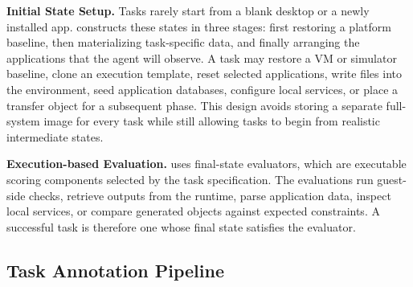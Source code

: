 
\noindent
\textbf{Initial State Setup.}
Tasks rarely start from a blank desktop or a newly installed app. \dataset constructs these states in three stages: first restoring a platform baseline, then materializing task-specific data, and finally arranging the applications that the agent will observe. A task may restore a VM or simulator baseline, clone an execution template, reset selected applications, write files into the environment, seed application databases, configure local services, or place a transfer object for a subsequent phase. This design avoids storing a separate full-system image for every task while still allowing tasks to begin from realistic intermediate states.



\noindent
\textbf{Execution-based Evaluation.} 
\dataset uses final-state evaluators, which are executable scoring components selected by the task specification. The evaluations run guest-side checks, retrieve outputs from the runtime, parse application data, inspect local services, or compare generated objects against expected constraints. A successful task is therefore one whose final state satisfies the evaluator.

\subsection{Task Annotation Pipeline}
\label{sec:annotation_pipeline}

